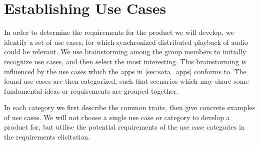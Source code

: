 \chapter{Establishing Use Cases}
\label{cha:establishing_use_cases}
In order to determine the requirements for the product we will develop, we identify a set of use cases, for which synchronized distributed playback of audio could be relevant.
We use brainstorming among the group members to initially recognize use cases, and then select the most interesting.
This brainstorming is influenced by the use cases which the apps in \cref{sec:sota_apps} conforms to.
The found use cases are then categorized, such that scenarios which may share some fundamental ideas or requirements are grouped together.

In each category we first describe the common traits, then give concrete examples of use cases.
We will not choose a single use case or category to develop a product for, but utilise the potential requirements of the use case categories in the requirements elicitation.


